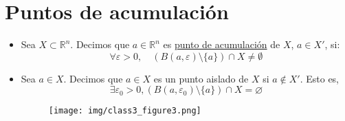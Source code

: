 \section{Puntos de acumulación}

\begin{itemize}
	\item Sea \( X \subset \mathbb{R}^n \). Decimos que \( a \in \mathbb{R}^n \) es \underline{punto de acumulación} de \( X \), \( a \in X' \), si:
	      \[
		      \forall \varepsilon > 0, \quad \left( B(a, \varepsilon) \setminus \{a\} \right) \cap X \neq \emptyset
	      \]

	\item Sea \( a \in X \). Decimos que \( a \in X \) es un punto aislado de \( X \) si \( a \notin X' \). Esto es,
	      \[
		      \exists \varepsilon_0 >0, (B(a, \varepsilon_0) \setminus \{a\}) \cap X = \varnothing
	      \]

	      \vspace{-2em}
	      \begin{figure}[H]
		      \centering
		      \texttt{[image: img/class3\_figure3.png]}
	      \end{figure}
	      \vspace{-1em}
\end{itemize}


